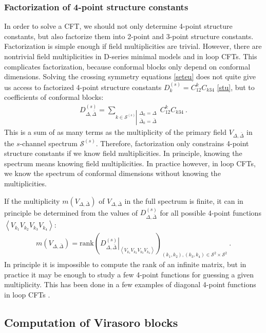 \documentclass[12pt, a4paper]{article}
\theoremstyle{break}
\begin{document}
\subsubsection{Factorization of 4-point structure constants}

In order to solve a CFT, we should not only determine 4-point structure constants, but also factorize them into 2-point and 3-point structure constants. Factorization is simple enough if field multiplicities are trivial. However, there are nontrivial field multiplicities in D-series minimal models and in loop CFTs. 
This complicates factorization, because conformal blocks only depend on conformal dimensions. Solving the crossing symmetry equations \eqref{seteu} does not quite give us access to factorized 4-point structure constants $D^{(s)}_k = C^k_{12}C_{k34}$ \eqref{stu}, but to coefficients of conformal blocks:
\begin{align}
 D^{(s)}_{\Delta,\bar\Delta} = \sum_{k\in\mathcal{S}^{(s)}\left|\substack{\Delta_k=\Delta\\ \bar{\Delta}_k=\bar\Delta}\right.} C^k_{12}C_{k34} \ .
 \label{dcc}
\end{align}
This is a sum of as many terms as the multiplicity of the primary field $V_{\Delta,\bar\Delta}$ in the $s$-channel spectrum $\mathcal{S}^{(s)}$. Therefore, factorization only constrains 4-point structure constants if we know field multiplicities. In principle, knowing the spectrum means knowing field multiplicities. In practice however, in loop CFTs, we know the spectrum of conformal dimensions without knowing the multiplicities. 

If the multiplicity $m(V_{\Delta,\bar\Delta})$ of $V_{\Delta,\bar\Delta}$ in the full spectrum is finite, it can in principle be determined from the values of $D^{(s)}_{\Delta,\bar\Delta}$ for all possible 4-point functions $\left<V_{k_1}V_{k_2}V_{k_3}V_{k_4}\right>$: 
\begin{align}
 m\left(V_{\Delta,\bar\Delta}\right) = \text{rank}\left(\left.D^{(s)}_{\Delta,\bar\Delta}\right|_{\left<V_{k_1}V_{k_2}V_{k_3}V_{k_4}\right>}\right)_{(k_1,k_2),(k_3,k_4)\in\mathcal{S}^2\times \mathcal{S}^2}\ .
\end{align}
In principle it is impossible to compute the rank of an infinite matrix, but 
in practice it may be enough to study a few 4-point functions for guessing a given multiplicity. This has been done in a few examples of diagonal 4-point functions in loop CFTs \cite{rib22}.


\subsection{Computation of Virasoro blocks}
\end{document}
